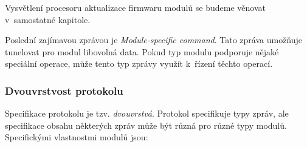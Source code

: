 Vysvětlení procesoru aktualizace firmwaru modulů se budeme věnovat v~samostatné
kapitole.

Poslední zajímavou zprávou je \textit{Module-specific command}. Tato zpráva
umožňuje tunelovat pro modul libovolná data. Pokud typ modulu podporuje nějaké
speciální operace, může tento typ zprávy využít k~řízení těchto operací.


\subsubsection{Dvouvrstvost protokolu}

Specifikace protokolu je tzv. \textit{dvouvrstvá}. Protokol specifikuje typy
zpráv, ale specifikace obsahu některých zpráv může být různá pro různé typy
modulů. Specifickými vlastnostmi modulů jsou:


